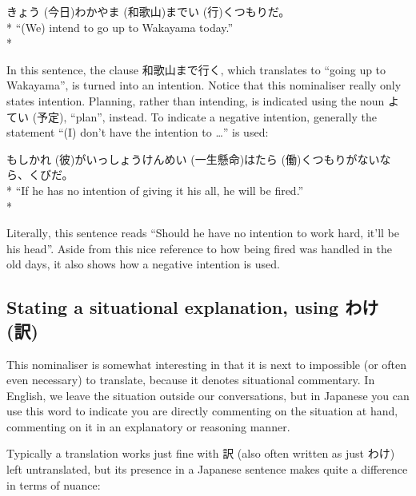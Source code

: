 \documentclass[11pt, b5paper, twoside, openright, onecolumn]{book}
\makeatletter
\newcommand*{\rubystack}[2]{{\relscale{0.5}%
  \begin{tabular}[b]{@{}c@{}}%
    {#1}\\%
   {\textscale{2}{#2}}%
  \end{tabular}}%
}
\DeclareRobustCommand*{\ruby}[2]{%
  \mbox{%
    \setlength{\parskip}{0ex}%
    \BeginAccSupp{method=pdfstringdef,ActualText={#1}}%
      \rubystack{\phantom{#2}}{#1}%
      \llap{%
        \rubystack{#2}{\phantom{#1}}%
      }%
    \EndAccSupp{}%
  }%
}
\renewcommand*{\ruby}[2]{#2 (#1)}%
\newenvironment{exampleblock}{
\setlength{\parindent}{0.6in}
\begin{minipage}[t]{\dimexpr\textwidth-\parindent}}
{\end{minipage}}
\makeatother
\begin{document}
\vspace{0.4cm}
\begin{exampleblock}
\ruby{今日}{きょう}\ruby{和歌山}{わかやま}まで\ruby{行}{い}くつもりだ。 \\* 
“(We) intend to go up to Wakayama today.” \\* 
\end{exampleblock}
\vspace{0.2cm}

In this sentence‚ the clause 和歌山まで行く‚ which translates to “going up to Wakayama”‚ is turned into an intention. Notice that this nominaliser really only states intention. Planning‚ rather than intending‚ is indicated using the noun \ruby{予定}{よてい}‚ “plan”‚ instead. To indicate a negative intention‚ generally the statement “(I) don’t have the intention to …” is used:

\vspace{0.4cm}
\begin{exampleblock}
もし\ruby{彼}{かれ}が\ruby{一生懸命}{いっしょうけんめい}\ruby{働}{はたら}くつもりがないなら、くびだ。 \\* 
“If he has no intention of giving it his all‚ he will be fired.” \\* 
\end{exampleblock}
\vspace{0.2cm}

Literally‚ this sentence reads “Should he have no intention to work hard‚ it’ll be his head”. Aside from this nice reference to how being fired was handled in the old days‚ it also shows how a negative intention is used.

\subsection{Stating a situational explanation‚ using \ruby{訳}{わけ}}

This nominaliser is somewhat interesting in that it is next to impossible (or often even necessary) to translate‚ because it denotes situational commentary. In English‚ we leave the situation outside our conversations‚ but in Japanese you can use this word to indicate you are directly commenting on the situation at hand‚ commenting on it in an explanatory or reasoning manner.

Typically a translation works just fine with 訳 (also often written as just わけ) left untranslated‚ but its presence in a Japanese sentence makes quite a difference in terms of nuance:
\end{document}
